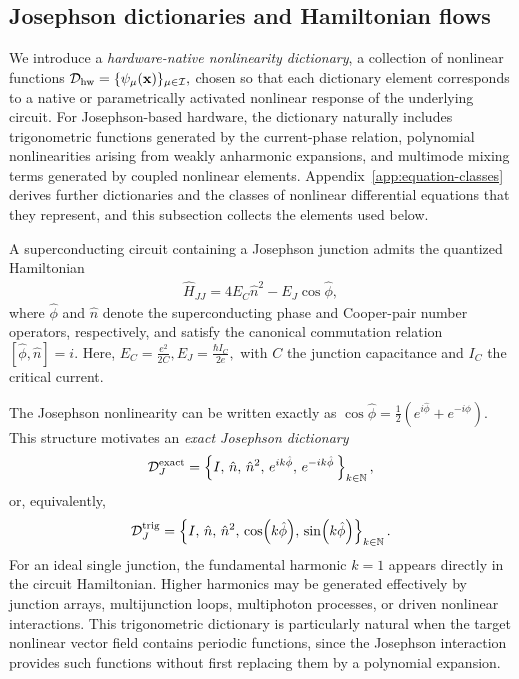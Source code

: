 \documentclass[pra,twocolumn,superscriptaddress,nofootinbib,floatfix]{revtex4-2}
\theoremstyle{remark}
\newcommand{\revcolor}{\color{blue}}
\DeclareRobustCommand{\rev}[1]{{\revcolor #1}}
\begin{document}
\subsection{\rev{Josephson dictionaries and Hamiltonian flows}}
\label{subsec:dictionaries}

We introduce a \emph{hardware-native nonlinearity dictionary}, a collection of nonlinear functions $\mathcal D_{\rm hw} = \{\psi_\mu(\mathbf x) \}_{\mu\in\mathcal I},$ chosen so that each dictionary element corresponds to a native or parametrically activated nonlinear response of the underlying circuit. For Josephson-based hardware, the dictionary naturally includes trigonometric functions generated by the current-phase relation, polynomial nonlinearities arising from weakly anharmonic expansions, and multimode mixing terms generated by coupled nonlinear elements. \rev{Appendix~\ref{app:equation-classes} derives further dictionaries and the classes of nonlinear differential equations that they represent, and this subsection collects the elements used below.}

A superconducting circuit containing a Josephson junction admits the quantized Hamiltonian
\begin{align}
\hat H_{JJ}=4E_C \hat n^2-E_J\cos\hat\phi,
\label{eq:jj-hamiltonian}
\end{align}
where \(\hat \phi\) and \(\hat n\) denote the superconducting phase and Cooper-pair number operators, respectively, and satisfy the canonical commutation relation \([\hat\phi,\hat n]=i.\) Here, $E_C=\frac{e^2}{2C}, E_J=\frac{\hbar I_C}{2e},$ with \(C\) the junction capacitance and \(I_C\) the critical current.

The Josephson nonlinearity can be written exactly as \(\cos\hat\phi=\frac{1}{2}\left(e^{i\hat\phi}+e^{-i\hat\phi}\right).\) This structure motivates an \emph{exact Josephson dictionary}
\begin{align}
\mathcal D_{J}^{\rm exact}=\left\{I,\,\hat n,\,\hat n^2,\,e^{ik\hat\phi},\,e^{-ik\hat\phi}\,\right\}_{k\in\mathbb N},
\label{eq:exact-josephson-dictionary}
\end{align}
or, equivalently,
\begin{align}
\mathcal D_{J}^{\rm trig}=\left\{I,\,\hat n,\,\hat n^2,\,\cos(k\hat\phi),\,\sin(k\hat\phi)\right\}_{k\in\mathbb N}.
\label{eq:trig-josephson-dictionary}
\end{align}
For an ideal single junction, the fundamental harmonic \(k=1\) appears directly in the circuit Hamiltonian. Higher harmonics may be generated effectively by junction arrays, multijunction loops, multiphoton processes, or driven nonlinear interactions. This trigonometric dictionary is particularly natural when the target nonlinear vector field contains periodic functions, since the Josephson interaction provides such functions without first replacing them by a polynomial expansion.
\end{document}
